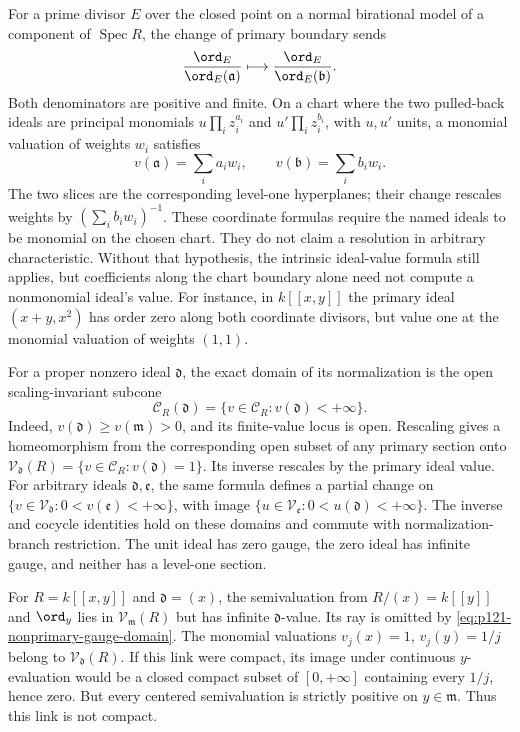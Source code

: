 For a prime divisor $E$ over the closed point on a normal birational
model of a component of $\operatorname{Spec}R$, the change of primary boundary sends
\[
             \frac{\ord_E}{\ord_E(\mathfrak a)}
                    \longmapsto
             \frac{\ord_E}{\ord_E(\mathfrak b)}.
\]
Both denominators are positive and finite. On a chart where the two
pulled-back ideals are principal monomials
$u\prod_i z_i^{a_i}$ and $u'\prod_i z_i^{b_i}$, with $u,u'$ units,
a monomial valuation of weights $w_i$ satisfies
\begin{equation}\label{eq:p121-monomial-gauge-slices}
                  v(\mathfrak a)=\sum_i a_iw_i,
                  \qquad v(\mathfrak b)=\sum_i b_iw_i.
\tag{70.7d}
\end{equation}
The two slices are the corresponding level-one hyperplanes; their change
rescales weights by $(\sum_i b_iw_i)^{-1}$. These coordinate formulas
require the named ideals to be monomial on the chosen chart. They do not
claim a resolution in arbitrary characteristic. Without that hypothesis,
the intrinsic ideal-value formula still applies, but coefficients along
the chart boundary alone need not compute a nonmonomial ideal's value.
For instance, in $k[[x,y]]$ the primary ideal $(x+y,x^2)$ has order
zero along both coordinate divisors, but value one at the monomial
valuation of weights $(1,1)$.

For a proper nonzero ideal $\mathfrak d$, the exact domain of its
normalization is the open scaling-invariant subcone
\begin{equation}\label{eq:p121-nonprimary-gauge-domain}
 \mathcal C_R(\mathfrak d)
       =\{v\in\mathcal C_R:v(\mathfrak d)<+\infty\}.
\tag{70.7e}
\end{equation}
Indeed, $v(\mathfrak d)\geq v(\mathfrak m)>0$, and its finite-value
locus is open. Rescaling gives a homeomorphism from the corresponding
open subset of any primary section onto
$\mathcal V_{\mathfrak d}(R)=\{v\in\mathcal C_R:v(\mathfrak d)=1\}$.
Its inverse rescales by the primary ideal value. For arbitrary ideals
$\mathfrak d,\mathfrak e$, the same formula defines a partial change
on $\{v\in\mathcal V_{\mathfrak d}:0<v(\mathfrak e)<+\infty\}$,
with image $\{u\in\mathcal V_{\mathfrak e}:0<u(\mathfrak d)<+\infty\}$.
The inverse and cocycle identities hold on these domains and commute
with normalization-branch restriction. The unit ideal has zero gauge,
the zero ideal has infinite gauge, and neither has a level-one section.

\begin{example}\label{ex:p121-nonprimary-noncompact-link}
For $R=k[[x,y]]$ and $\mathfrak d=(x)$, the semivaluation from
$R/(x)=k[[y]]$ and $\ord_y$ lies in $\mathcal V_{\mathfrak m}(R)$
but has infinite $\mathfrak d$-value. Its ray is omitted by
\eqref{eq:p121-nonprimary-gauge-domain}. The monomial valuations
$v_j(x)=1$, $v_j(y)=1/j$ belong to $\mathcal V_{\mathfrak d}(R)$.
If this link were compact, its image under continuous $y$-evaluation
would be a closed compact subset of $[0,+\infty]$ containing every
$1/j$, hence zero. But every centered semivaluation is strictly positive
on $y\in\mathfrak m$. Thus this link is not compact.
\end{example}

